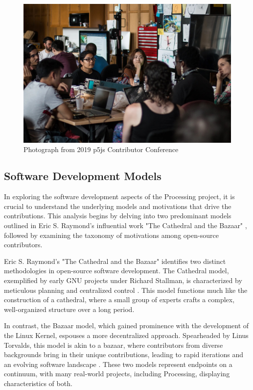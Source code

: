 
\begin{figure}
	\centering
	\includegraphics[width=\textwidth]{images/cathedral-or-bazaar.jpeg}
	\caption{Photograph from 2019 p5js Contributor Conference}
	\label{fig:p5ps-conference}
\end{figure}


\subsection{Software Development Models}

In exploring the software development aspects of the Processing project, it is crucial to understand the underlying models and motivations that drive the contributions. This analysis begins by delving into two predominant models outlined in Eric S. Raymond's influential work "The Cathedral and the Bazaar" \parencite{CathedralBazaarMusings2002a}, followed by examining the taxonomy of motivations among open-source contributors.

Eric S. Raymond's "The Cathedral and the Bazaar" identifies two distinct methodologies in open-source software development. The Cathedral model, exemplified by early GNU projects under Richard Stallman, is characterized by meticulous planning and centralized control \parencite{StallmanGNUManifesto1985}. This model functions much like the construction of a cathedral, where a small group of experts crafts a complex, well-organized structure over a long period.

In contrast, the Bazaar model, which gained prominence with the development of the Linux Kernel, espouses a more decentralized approach. Spearheaded by Linus Torvalds, this model is akin to a bazaar, where contributors from diverse backgrounds bring in their unique contributions, leading to rapid iterations and an evolving software landscape \parencite{TorvaldsLinuxKernelDevelopment1991}. These two models represent endpoints on a continuum, with many real-world projects, including Processing, displaying characteristics of both.

